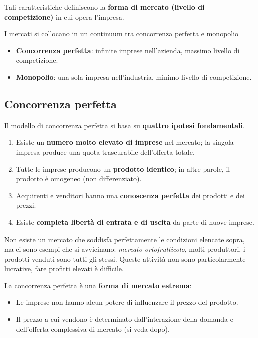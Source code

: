 \documentclass[../main.tex]{subfiles}
\begin{document}
Tali caratteristiche definiscono la \textbf{forma di mercato (livello di competizione)} in cui opera l'impresa.

I mercati si collocano in un continuum tra concorrenza perfetta e monopolio
\begin{itemize}
    \item \textbf{Concorrenza perfetta}: infinite imprese nell'azienda, massimo livello di competizione.
    \item \textbf{Monopolio}: una sola impresa nell'industria, minimo livello di competizione.
\end{itemize}

\subsection{Concorrenza perfetta}

Il modello di concorrenza perfetta si basa su \textbf{quattro ipotesi fondamentali}.
\begin{enumerate}
    \item Esiste un \textbf{numero molto elevato di imprese} nel mercato; la singola impresa produce una quota trascurabile dell'offerta totale.
    \item Tutte le imprese producono un \textbf{prodotto identico}; in altre parole, il prodotto è omogeneo (non differenziato).
    \item Acquirenti e venditori hanno una \textbf{conoscenza perfetta} dei prodotti e dei prezzi.
    \item Esiste \textbf{completa libertà di entrata e di uscita} da parte di nuove imprese.
\end{enumerate}

Non esiste un mercato che soddisfa perfettamente le condizioni elencate sopra, ma ci sono esempi che si avvicinano: \emph{mercato ortofrutticolo}, molti produttori, i prodotti venduti sono tutti gli stessi. Queste attività non sono particolarmente lucrative, fare profitti elevati è difficile.

La concorrenza perfetta è una \textbf{forma di mercato estrema}:
\begin{itemize}
    \item Le imprese non hanno alcun potere di influenzare il prezzo del prodotto.
    \item Il prezzo a cui vendono è determinato dall'interazione della domanda e dell'offerta complessiva di mercato (si veda dopo).
\end{itemize}
\end{document}
